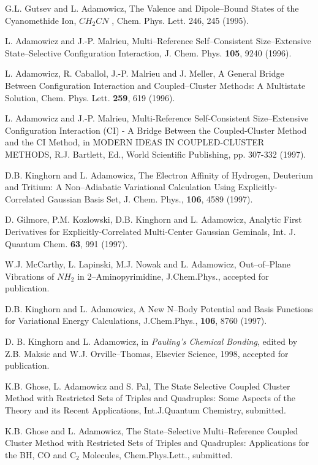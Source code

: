 \begin{thebibliography}{999}
G.L. Gutsev and L. Adamowicz, The Valence and 
Dipole--Bound States of the Cyanomethide Ion,
$CH_2CN$ , Chem. Phys. Lett. 246, 245 (1995).

L. Adamowicz and J.-P. Malrieu, Multi--Reference 
Self--Consistent Size--Extensive State--Selective
Configuration Interaction, J. Chem. Phys. 
{\bf 105}, 9240 (1996).

L. Adamowicz, R. Caballol, J.-P. Malrieu and J. Meller, 
A General Bridge Between Configuration
Interaction and Coupled--Cluster Methods:  A Multistate 
Solution, Chem. Phys. Lett.
{\bf 259}, 619 (1996).

L. Adamowicz and J.-P. Malrieu, Multi-Reference Self-Consistent 
Size--Extensive Configuration
Interaction (CI) - A Bridge Between the Coupled-Cluster 
Method and the CI Method, in MODERN
IDEAS IN COUPLED-CLUSTER METHODS, R.J. Bartlett, 
Ed., World Scientific Publishing, pp. 307-332 (1997).

D.B. Kinghorn and L. Adamowicz, 
The Electron Affinity of Hydrogen, Deuterium and Tritium:  
A Non--Adiabatic Variational Calculation Using Explicitly-Correlated 
Gaussian Basis Set, J. Chem. Phys.,
{\bf 106}, 4589 (1997).

D. Gilmore, P.M. Kozlowski, D.B. Kinghorn and 
L. Adamowicz, Analytic First Derivatives for
Explicitly-Correlated Multi-Center Gaussian Geminals, 
Int. J. Quantum Chem. {\bf 63}, 991 (1997).

W.J. McCarthy, L. Lapinski, M.J. Nowak and L. Adamowicz,
Out--of--Plane Vibrations of $NH_2$ in 2--Aminopyrimidine, 
J.Chem.Phys., accepted for publication.  

D.B. Kinghorn and L. Adamowicz,
A New N--Body Potential and Basis Functions for
Variational Energy Calculations,
J.Chem.Phys., {\bf 106}, 8760 (1997).

D. B. Kinghorn and L. Adamowicz, in {\em Pauling's Chemical
Bonding}, edited by Z.B. Maksic and W.J. Orville--Thomas,
Elsevier Science, 1998, accepted for publication.

K.B. Ghose, L. Adamowicz and S. Pal,
The State Selective Coupled Cluster Method with
Restricted Sets of Triples and Quadruples:
Some Aspects of the Theory and its Recent Applications,
Int.J.Quantum Chemistry, submitted.

K.B. Ghose and L. Adamowicz,
The State--Selective Multi--Reference Coupled Cluster
Method with Restricted Sets of Triples and Quadruples:
Applications for the BH, CO and C$_2$ Molecules,
Chem.Phys.Lett., submitted.



\end{thebibliography}
